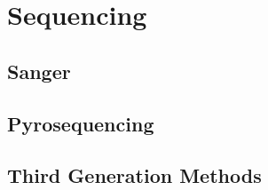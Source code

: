 \section{Sequencing}

\subsection{Sanger}

\subsection{Pyrosequencing}

\subsection{Third Generation Methods}
